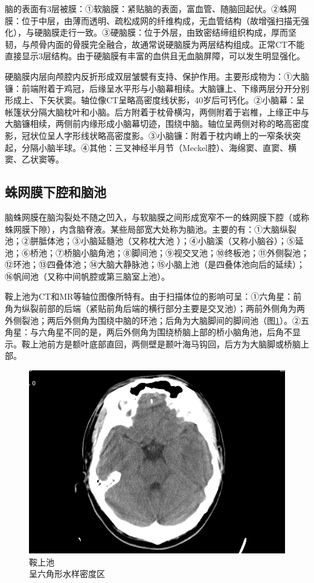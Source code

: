 脑的表面有3层被膜：①软脑膜：紧贴脑的表面，富血管、随脑回起伏。②蛛网膜：位于中层，由薄而透明、疏松成网的纤维构成，无血管结构（故增强扫描无强化），与硬脑膜走行一致。③硬脑膜：位于外层，由致密结缔组织构成，厚而坚韧，与颅骨内面的骨膜完全融合，故通常说硬脑膜为两层结构组成。正常CT不能直接显示3层结构。由于硬脑膜有丰富的血供且无血脑屏障，可以发生明显强化。

硬脑膜内层向颅腔内反折形成双层皱襞有支持、保护作用。主要形成物为：①大脑镰：前端附着于鸡冠，后缘呈水平形与小脑幕相续。大脑镰上、下缘两层分开分别形成上、下矢状窦。轴位像CT呈略高密度线状影，40岁后可钙化。②小脑幕：呈帐篷状分隔大脑枕叶和小脑。后方附着于枕骨横沟，两侧附着于岩椎，上缘正中与大脑镰相续，两侧前内缘形成小脑幕切迹，围绕中脑。轴位呈两侧对称的略高密度影，冠状位呈人字形线状略高密度影。③小脑镰：附着于枕内嵴上的一窄条状突起，分隔小脑半球。④其他：三叉神经半月节（Meckel腔）、海绵窦、直窦、横窦、乙状窦等。

\subsection{蛛网膜下腔和脑池}

脑蛛网膜在脑沟裂处不随之凹入，与软脑膜之间形成宽窄不一的蛛网膜下腔（或称蛛网膜下隙），内含脑脊液。某些局部宽大处称为脑池。主要的有：①大脑纵裂池；②胼胝体池；③小脑延髓池（又称枕大池
）；④小脑溪（又称小脑谷）；⑤延池；⑥桥池；⑦桥脑小脑角池；⑧脚间池；⑨视交叉池；⑩终板池；⑪外侧裂池；⑫环池；⑬四叠体池；⑭大脑大静脉池；⑮小脑上池（是四叠体池向后的延续）；⑯帆间池（又称中间帆腔或第三脑室上池）。

鞍上池为CT和MR等轴位图像所特有。由于扫描体位的影响可呈：①六角星：前角为纵裂前部的后端（紧贴前角后端的横行部分主要是交叉池）；两前外侧角为两外侧裂池；两后外侧角为围绕中脑的环池；后角为大脑脚间的脚间池（图\ref{fig2-1}）。②五角星：与六角星不同的是，两后外侧角为围绕桥脑上部的桥小脑角池，后角不显示。鞍上池前方是额叶底部直回，两侧壁是颞叶海马钩回，后方为大脑脚或桥脑上部。

\begin{figure}[!htbp]
 \centering
 \includegraphics[width=.7\textwidth,height=\textheight,keepaspectratio]{./images/Image00005.jpg}
 \captionsetup{justification=centering}
 \caption{鞍上池 \\{\small 呈六角形水样密度区}}
 \label{fig2-1}
  \end{figure} 



